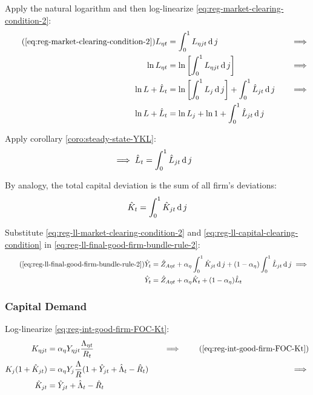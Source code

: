 \documentclass[
	thesis.tex
	]{subfiles}
\begin{document}
Apply the natural logarithm and then log-linearize \ref{eq:reg-market-clearing-condition-2}:
\begin{alignat}{2}
	\tag{\ref{eq:reg-market-clearing-condition-2}}
	L_{\eta t} &= \int_{0}^{1} L_{\eta jt} \dif j &\implies \\
	\ln L_{\eta t} &= \ln \left[ \int_{0}^{1} L_{\eta jt} \dif j \right] &\implies \nonumber \\
	\ln L + \hat{L}_t &= \ln \left[ \int_{0}^{1} L_{j} \dif j \right] + \int_{0}^{1} \hat{L}_{jt} \dif j \quad &\implies \nonumber \\
	\ln L + \hat{L}_t &= \ln L_{j} + \ln 1 + \int_{0}^{1} \hat{L}_{jt} \dif j \nonumber
\end{alignat}

Apply corollary \ref{coro:steady-state-YKL}:
\begin{align}
	\implies \hat{L}_t &= \int_{0}^{1} \hat{L}_{jt} \operatorname{d} j \label{eq:reg-ll-market-clearing-condition-2}
\end{align}

By analogy, the total capital deviation is the sum of all firm's deviations:
\begin{align}
	\hat{K}_t = \int_{0}^{1} \hat{K}_{jt} \operatorname{d} j \label{eq:reg-ll-capital-clearing-condition}
\end{align}

Substitute \ref{eq:reg-ll-market-clearing-condition-2} and \ref{eq:reg-ll-capital-clearing-condition} in \ref{eq:reg-ll-final-good-firm-bundle-rule-2}:
\begin{align}
	\tag{\ref{eq:reg-ll-final-good-firm-bundle-rule-2}}
	\hat{Y}_t &= \hat{Z}_{A\eta t} + {\alpha_\eta} \int_{0}^{1} \hat{K}_{jt} \dif j + (1-{\alpha_\eta}) \int_{0}^{1} \hat{L}_{jt} \dif j \implies \\
	\hat{Y}_t &= \hat{Z}_{A\eta t} + {\alpha_\eta} \hat{K}_t + (1-{\alpha_\eta}) \hat{L}_t \label{eq:reg-ll-final-good-firm-bundle-rule-3}
\end{align}


\subsubsection{Capital Demand}

Log-linearize \ref{eq:reg-int-good-firm-FOC-Kt}:
\begin{alignat}{2}
	K_{\eta jt} &= {\alpha_\eta} Y_{\eta jt} \frac{\Lambda_{\eta t}}{R_t} &\implies \tag{\ref{eq:reg-int-good-firm-FOC-Kt}} \\
	K_j (1+ \hat{K}_{jt}) &= {\alpha_\eta} Y_{j} \frac{\Lambda}{R} (1+ \hat{Y}_{jt} + \hat{\Lambda}_t - \hat{R}_t) \quad &\implies \nonumber \\
	\hat{K}_{jt} &= \hat{Y}_{jt} + \hat{\Lambda}_t - \hat{R}_t \nonumber
\end{alignat}
\end{document}
